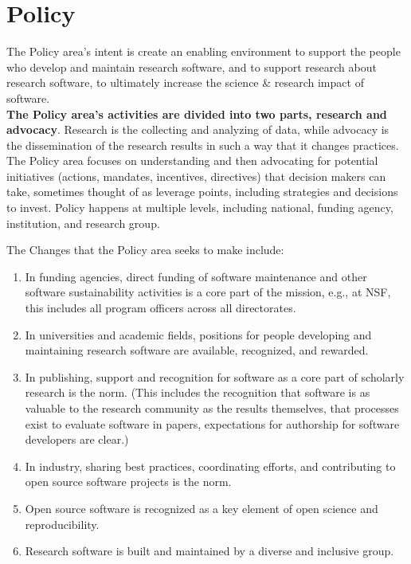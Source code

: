 \documentclass[
]{book}
\begin{document}
\hypertarget{Ch-Policy}{%
\chapter{Policy}\label{Ch-Policy}}

The Policy area's intent is create an enabling environment to support the people who develop and maintain research software, and to
support research about research software, to ultimately increase the science \& research impact of
software.\\
\textbf{The Policy area's activities are divided into two parts, research and advocacy}. Research is the collecting
and analyzing of data, while advocacy is the dissemination of the research results in such a way that it
changes practices.
The Policy area focuses on understanding and then advocating for potential initiatives (actions, mandates, incentives, directives)
that decision makers can take, sometimes thought of as leverage points,
including strategies and decisions to invest. Policy happens at multiple levels, including national,
funding agency, institution, and research group.

The Changes that the Policy area seeks to make include:

\begin{enumerate}
\def\labelenumi{\arabic{enumi}.}
\item
  In funding agencies, direct funding of software maintenance and other software sustainability activities
  is a core part of the mission, e.g., at NSF, this includes all program officers across all directorates.
\item
  In universities and academic fields, positions for people developing and maintaining research software
  are available, recognized, and rewarded.
\item
  In publishing, support and recognition for software as a core part of scholarly research is the norm.
  (This includes the recognition that software is as valuable to the research community as the results themselves,
  that processes exist to evaluate software in papers, expectations for authorship for software developers are clear.)
\item
  In industry, sharing best practices, coordinating efforts, and contributing to open source software
  projects is the norm.
\item
  Open source software is recognized as a key element of open science and reproducibility.
\item
  Research software is built and maintained by a diverse and inclusive group.
\end{enumerate}
\end{document}
